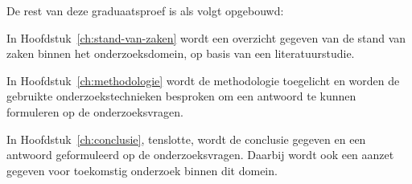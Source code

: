 De rest van deze graduaatsproef is als volgt opgebouwd:

In Hoofdstuk~\ref{ch:stand-van-zaken} wordt een overzicht gegeven van de stand van zaken binnen het onderzoeksdomein, op basis van een literatuurstudie.

In Hoofdstuk~\ref{ch:methodologie} wordt de methodologie toegelicht en worden de gebruikte onderzoekstechnieken besproken om een antwoord te kunnen formuleren op de onderzoeksvragen.

In Hoofdstuk~\ref{ch:conclusie}, tenslotte, wordt de conclusie gegeven en een antwoord geformuleerd op de onderzoeksvragen. Daarbij wordt ook een aanzet gegeven voor toekomstig onderzoek binnen dit domein.